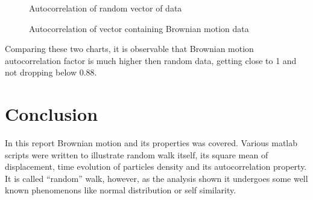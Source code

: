\documentclass[onecolumn]{article}
\begin{document}
\begin{figure}[H]
\noindent{}
\caption{Autocorrelation of random vector of data}
\label{fig:ac_r}
\end{figure}

\begin{figure}[H]
\noindent{}
\caption{Autocorrelation of vector containing Brownian motion data}
\label{fig:ac_b}
\end{figure}

Comparing these two charts, it is observable that Brownian motion autocorrelation factor is much higher then random data, getting close to 1 and not dropping below 0.88. 

\section{Conclusion}
In this report Brownian motion and its properties was covered. Various matlab scripts were written to illustrate random walk itself, its square mean of displacement, time evolution of particles density and its autocorrelation property. It is called ``random'' walk, however, as the analysis shown it undergoes some well known phenomenons like normal distribution or self similarity.
\end{document}
